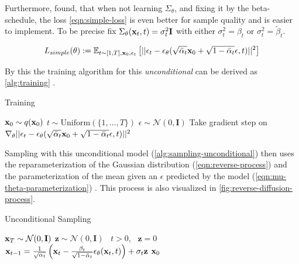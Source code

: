 Furthermore, \textcite{ddpm} found, that when not learning $\Sigma_\theta$, and fixing it by the beta-schedule, the loss \autoref{eqn:simple-loss} is even better for sample quality and is easier to implement.
To be precise \textcite{ddpm} fix $\Sigma_\theta(\mathbf{x}_t, t) = \sigma_t^2\mathbf{I}$ with either $\sigma_t^2 = \beta_t$ or $\sigma_t^2 = \tilde{\beta}_t$.

\begin{equation}
   \label{eqn:simple-loss}
   L_{simple}(\theta) := \mathbb{E}_{t \sim [1,T], \mathbf{x}_0, \epsilon_t}\left[ || \epsilon_t - \epsilon_\theta(\sqrt{\bar{\alpha}_t}\mathbf{x}_0 + \sqrt{1 - \bar{\alpha}_t} \epsilon,t)  ||^2 \right]
\end{equation}

By this the training algorithm for this \textit{unconditional} can be derived as \autoref{alg:training} \parencite{ddpm}.

\begin{algorithm}[htp!]
   \caption{Training \parencite{ddpm}}
   \label{alg:training}
   \begin{algorithmic}
      \Repeat
      \State $\mathbf{x}_0 \sim q(\mathbf{x}_0)$
      \State $t \sim \mathrm{Uniform}(\{1, \dots, T\})$
      \State $\epsilon \sim \mathcal{N}(0, \mathbf{I})$
      \State Take gradient step on $\nabla_\theta || \epsilon_t - \epsilon_\theta(\sqrt{\bar{\alpha}_t}\mathbf{x}_0 + \sqrt{1 - \bar{\alpha}_t} \epsilon,t) ||^2$
   \end{algorithmic}
\end{algorithm}



Sampling with this unconditional model (\autoref{alg:sampling-unconditional}) then uses the reparameterization of the Gaussian distribution (\autoref{eqn:reverse-process})
and the parameterization of the mean given an $\epsilon$ predicted by the model (\autoref{eqn:mu-theta-parameterization}) \parencite{ddpm}.
This process is also visualized in \autoref{fig:reverse-diffusion-process}.


\begin{algorithm}[htp!]
   \caption{Unconditional Sampling \parencite{ddpm}}
   \label{alg:sampling-unconditional}
   \begin{algorithmic}
      \State $\mathbf{x}_T \sim \mathcal{N}(0, \mathbf{I})$
      \State $\mathbf{z} \sim \mathcal{N}(0, \mathbf{I})$ \algorithmicif\ $t > 0$, \algorithmicelse\ $\mathbf{z} = 0$
      \State $\mathbf{x}_{t-1} = \frac{1}{\sqrt{\alpha_t}} \left(\mathbf{x}_t - \frac{\beta_t}{\sqrt{1 - \bar{\alpha}_t}} \epsilon_\theta(\mathbf{x}_t, t) \right) + \sigma_t \mathbf{z}$
      \EndFor
      \Return $\mathbf{x}_0$
   \end{algorithmic}
\end{algorithm}

